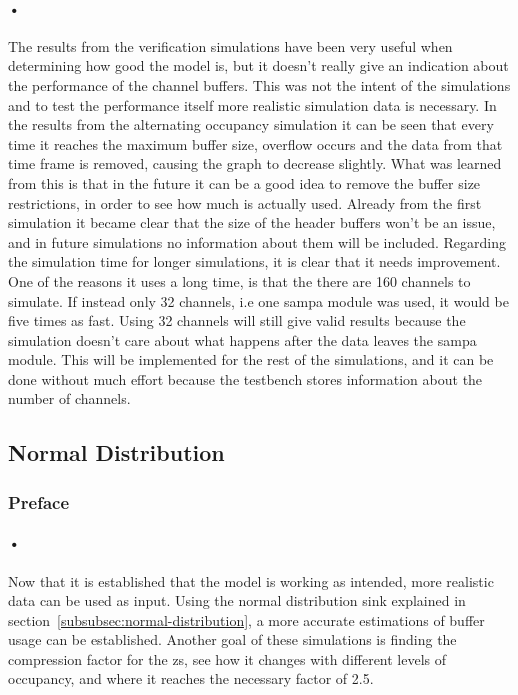 \documentclass[a4paper, 12pt]{report}
\begin{document}
\paragraph{•}
The results from the verification simulations have been very useful when determining how good the model is, but it doesn't really give an indication about the performance of the channel buffers.
This was not the intent of the simulations and to test the performance itself more realistic simulation data is necessary.
In the results from the alternating occupancy simulation it can be seen that every time it reaches the maximum buffer size, overflow occurs and the data from that time frame is removed, causing the graph to decrease slightly.
What was learned from this is that in the future it can be a good idea to remove the buffer size restrictions, in order to see how much is actually used.
Already from the first simulation it became clear that the size of the header buffers won't be an issue, and in future simulations no information about them will be included. 
Regarding the simulation time for longer simulations, it is clear that it needs improvement.
One of the reasons it uses a long time, is that the there are 160 channels to simulate.
If instead only 32 channels, i.e one \gls{sampa} module was used, it would be five times as fast.
Using 32 channels will still give valid results because the simulation doesn't care about what happens after the data leaves the \gls{sampa} module.
This will be implemented for the rest of the simulations, and it can be done without much effort because the testbench stores information about the number of channels.

\subsection{Normal Distribution}

\subsubsection{Preface}

\paragraph{•}
Now that it is established that the model is working as intended, more realistic data can be used as input.
Using the normal distribution sink explained in section~\ref{subsubsec:normal-distribution}, a more accurate estimations of buffer usage can be established.
Another goal of these simulations is finding the compression factor for the \gls{zs}, see how it changes with different levels of occupancy, and where it reaches the necessary factor of 2.5.
\end{document}
